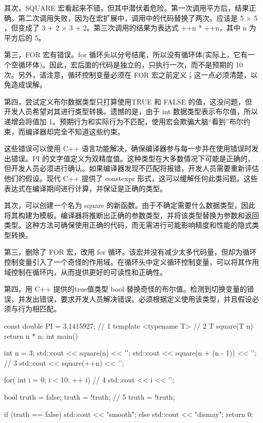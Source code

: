 其次，SQUARE 宏看起来不错，但其中潜伏着危险。第一次调用平方后，结果正确。第二次调用失败，因为在宏扩展中，调用中的代码替换了两次。应该是 5 × 5 ，但变成了 3 + 2 × 3 + 2。第三次调用的结果为表达式 ++n * ++n，其中 n 为平方后的 5。

第三，FOR 宏有错误。for 循环头以分号结尾，所以没有循环体(实际上，它有一个空循环体)。因此，宏后面的代码是独立的，只执行一次，而不是预期的 10 次。另外，请注意，循环控制变量必须在 FOR 宏之前定义；这一点必须清楚，以免造成误解。

第四，尝试定义布尔数据类型只打算使用TRUE 和 FALSE 的值，这没问题，但开发人员希望对其进行类型转换。遗憾的是，由于 int 数据类型表示布尔值，所以递增会将值加 1。预期行为和实际行为不匹配，使用宏会欺骗大脑“看到”布尔约束，而编译器却完全不知道这些约束。


这些错误可以使用 C++ 语言功能解决，确保编译器参与每一步并在使用错误时发出错误。PI 的文字值定义为双精度值。这种类型在大多数情况下可能是正确的，但开发人员必须进行确认。如果编译器发现不匹配将报错，开发人员需要重新评估他们的假设。现代 C++ 提供了 constexpr 形式，这可以缓解任何此类问题。这些表达式在编译期间进行计算，并保证是正确的类型。

其次，可以创建一个名为 square 的新函数。由于不确定需要什么数据类型，因此将其构建为模板。编译器将推断出正确的参数类型，并将该类型替换为参数和返回类型。这种方法可确保使用正确的代码，而无需进行可能影响精度和性能的隐式类型转换。

第三，删除了 FOR 宏，改用 for 循环。该宏并没有减少太多代码量，但却为循环控制变量引入了一个奇怪的作用域。在循环头中定义循环控制变量，可以将其作用域控制在循环内，从而提供更好的可读性和正确性。

第四，用 C++ 提供的true值类型 bool 替换奇怪的布尔值。检测到切换变量的错误，并发出错误，要求开发人员解决错误。必须根据定义使用该类型，并且假设必须与行为相匹配。


\begin{cpp}
const double PI = 3.1415927; // 1
template <typename T> // 2
T square(T n) {
  return n * n;
}
int main() {
  int n = 3;
  std::cout << square(n) << '\n';
  std::cout << square(n + (n - 1)) << '\n'; // 3
  std::cout << square(++n) << '\n';

  for( int i = 0; i < 10; ++ i) // 4
    std::cout << i << '\n';

  bool truth = false;
  truth = !truth; // 5
  truth = !truth;

  if (truth == false)
    std::cout << "smooth\n";
  else
    std::cout << "dismay\n";
  return 0;
}
\end{cpp}

